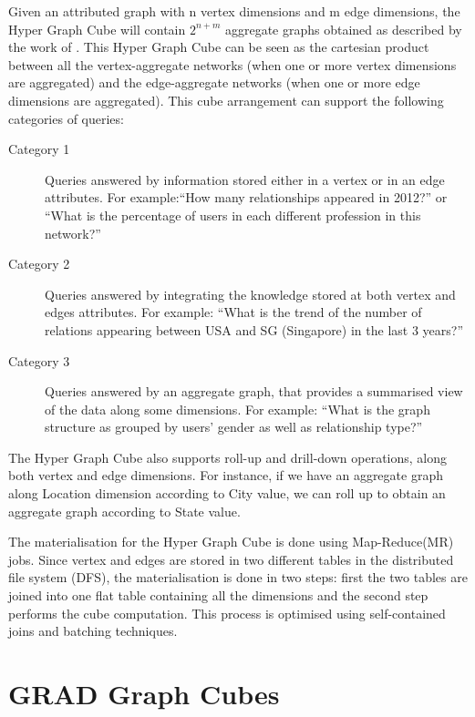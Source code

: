 Given an attributed graph with n vertex dimensions and m edge dimensions, the Hyper Graph Cube will contain $2^{n+m}$ aggregate graphs obtained as described by the work of \cite{Zhao2011}. This Hyper Graph Cube can be seen as the cartesian product between all the vertex-aggregate networks (when one or more vertex dimensions are aggregated) and the edge-aggregate networks (when one or more edge dimensions are aggregated). This cube arrangement can support the following categories of queries:

\begin{description}
\item[Category 1] Queries answered by information stored either in a vertex or in an edge attributes. For example:``How many relationships appeared in 2012?'' or ``What is the percentage of users in each different profession in this network?''
\item[Category 2] Queries answered by integrating the knowledge stored at both vertex and edges attributes. For example: ``What is the trend of the number of relations appearing between USA and SG (Singapore) in the last 3 years?''
\item[Category 3] Queries answered by an aggregate graph, that provides a summarised view of the data along some dimensions. For example: ``What is the graph structure as grouped by users' gender as well as relationship type?''
\end{description}

The Hyper Graph Cube also supports roll-up and drill-down operations, along both vertex and edge dimensions. For instance, if we have an aggregate graph along Location dimension according to City value, we can roll up to obtain an aggregate graph according to State value.

The materialisation for the Hyper Graph Cube is done using Map-Reduce(MR) jobs. Since vertex and edges are stored in two different tables in the distributed file system (DFS), the materialisation is done in two steps: first the two tables are joined into one flat table containing all the dimensions and the second step performs the cube computation. This process is optimised using self-contained joins and batching techniques.

\section{GRAD Graph Cubes}

